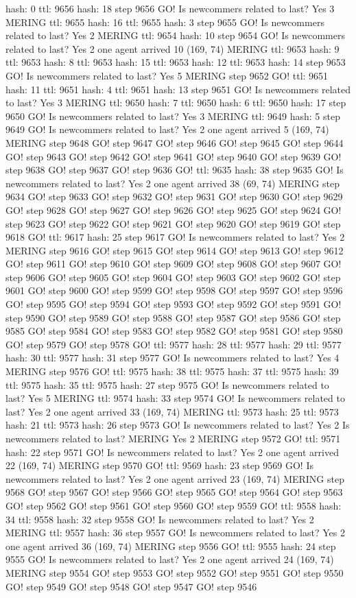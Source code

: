 hash: 0 ttl: 9656 hash: 18 step 9656 GO! Is newcommers related to last? Yes 3 MERING ttl: 9655 hash: 16 ttl: 9655 hash: 3 step 9655 GO! Is newcommers related to last? Yes 2 MERING ttl: 9654 hash: 10 step 9654 GO! Is newcommers related to last? Yes 2 one agent arrived 10 (169, 74) MERING ttl: 9653 hash: 9 ttl: 9653 hash: 8 ttl: 9653 hash: 15 ttl: 9653 hash: 12 ttl: 9653 hash: 14 step 9653 GO! Is newcommers related to last? Yes 5 MERING step 9652 GO! ttl: 9651 hash: 11 ttl: 9651 hash: 4 ttl: 9651 hash: 13 step 9651 GO! Is newcommers related to last? Yes 3 MERING ttl: 9650 hash: 7 ttl: 9650 hash: 6 ttl: 9650 hash: 17 step 9650 GO! Is newcommers related to last? Yes 3 MERING ttl: 9649 hash: 5 step 9649 GO! Is newcommers related to last? Yes 2 one agent arrived 5 (169, 74) MERING step 9648 GO! step 9647 GO! step 9646 GO! step 9645 GO! step 9644 GO! step 9643 GO! step 9642 GO! step 9641 GO! step 9640 GO! step 9639 GO! step 9638 GO! step 9637 GO! step 9636 GO! ttl: 9635 hash: 38 step 9635 GO! Is newcommers related to last? Yes 2 one agent arrived 38 (69, 74) MERING step 9634 GO! step 9633 GO! step 9632 GO! step 9631 GO! step 9630 GO! step 9629 GO! step 9628 GO! step 9627 GO! step 9626 GO! step 9625 GO! step 9624 GO! step 9623 GO! step 9622 GO! step 9621 GO! step 9620 GO! step 9619 GO! step 9618 GO! ttl: 9617 hash: 25 step 9617 GO! Is newcommers related to last? Yes 2 MERING step 9616 GO! step 9615 GO! step 9614 GO! step 9613 GO! step 9612 GO! step 9611 GO! step 9610 GO! step 9609 GO! step 9608 GO! step 9607 GO! step 9606 GO! step 9605 GO! step 9604 GO! step 9603 GO! step 9602 GO! step 9601 GO! step 9600 GO! step 9599 GO! step 9598 GO! step 9597 GO! step 9596 GO! step 9595 GO! step 9594 GO! step 9593 GO! step 9592 GO! step 9591 GO! step 9590 GO! step 9589 GO! step 9588 GO! step 9587 GO! step 9586 GO! step 9585 GO! step 9584 GO! step 9583 GO! step 9582 GO! step 9581 GO! step 9580 GO! step 9579 GO! step 9578 GO! ttl: 9577 hash: 28 ttl: 9577 hash: 29 ttl: 9577 hash: 30 ttl: 9577 hash: 31 step 9577 GO! Is newcommers related to last? Yes 4 MERING step 9576 GO! ttl: 9575 hash: 38 ttl: 9575 hash: 37 ttl: 9575 hash: 39 ttl: 9575 hash: 35 ttl: 9575 hash: 27 step 9575 GO! Is newcommers related to last? Yes 5 MERING ttl: 9574 hash: 33 step 9574 GO! Is newcommers related to last? Yes 2 one agent arrived 33 (169, 74) MERING ttl: 9573 hash: 25 ttl: 9573 hash: 21 ttl: 9573 hash: 26 step 9573 GO! Is newcommers related to last? Yes 2 Is newcommers related to last? MERING Yes 2 MERING step 9572 GO! ttl: 9571 hash: 22 step 9571 GO! Is newcommers related to last? Yes 2 one agent arrived 22 (169, 74) MERING step 9570 GO! ttl: 9569 hash: 23 step 9569 GO! Is newcommers related to last? Yes 2 one agent arrived 23 (169, 74) MERING step 9568 GO! step 9567 GO! step 9566 GO! step 9565 GO! step 9564 GO! step 9563 GO! step 9562 GO! step 9561 GO! step 9560 GO! step 9559 GO! ttl: 9558 hash: 34 ttl: 9558 hash: 32 step 9558 GO! Is newcommers related to last? Yes 2 MERING ttl: 9557 hash: 36 step 9557 GO! Is newcommers related to last? Yes 2 one agent arrived 36 (169, 74) MERING step 9556 GO! ttl: 9555 hash: 24 step 9555 GO! Is newcommers related to last? Yes 2 one agent arrived 24 (169, 74) MERING step 9554 GO! step 9553 GO! step 9552 GO! step 9551 GO! step 9550 GO! step 9549 GO! step 9548 GO! step 9547 GO! step 9546 